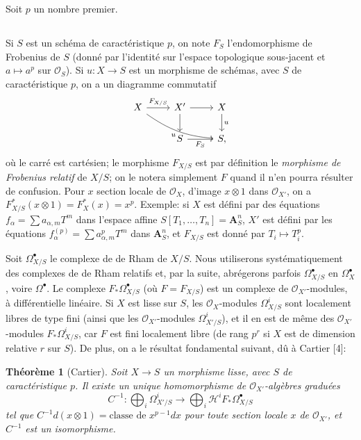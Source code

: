 \documentclass[12pt,a4paper]{article}
\theoremstyle{plain}
\newtheorem{theorem}{Th\'eor\`eme}[section]
\theoremstyle{definition}
\theoremstyle{remark}
\newcommand{\cO}{\mathcal{O}}
\begin{document}
Soit $p$ un nombre premier.

\subsection{}

Si $S$ est un sch\'ema de caract\'eristique $p$, on note $F_S$ l'endomorphisme de
Frobenius de $S$ (donn\'e par l'identit\'e sur l'espace topologique sous-jacent et $a \mapsto a^p$
sur $\cO_S$). Si $u: X \to S$ est un morphisme de sch\'emas, avec $S$ de caract\'eristique $p$, on a
un diagramme commutatif
\[
\begin{tikzcd}
X \arrow[r, "F_{X/S}"] \arrow[rrd, "u"', bend right=15] & X' \arrow[r] \arrow[d] & X \arrow[d, "u"] \\
& S \arrow[r, "F_S"'] & S,
\end{tikzcd}
\]
o\`u le carr\'e est cart\'esien; le morphisme $F_{X/S}$ est par d\'efinition le \emph{morphisme de
Frobenius relatif} de $X/S$; on le notera simplement $F$ quand il n'en pourra r\'esulter
de confusion. Pour $x$ section locale de $\cO_X$, d'image $x \otimes 1$ dans $\cO_{X'}$, on a $F_{X/S}^*(x \otimes 1)
= F_X^*(x) = x^p$. Exemple: si $X$ est d\'efini par des \'equations $f_{\alpha} = \sum a_{\alpha,m} T^m$ dans l'espace
affine $S[T_1, \ldots, T_n] = \mathbf{A}^n_S$, $X'$ est d\'efini par les \'equations $f_{\alpha}^{(p)} = \sum a_{\alpha,m}^p T^m$ dans $\mathbf{A}^n_S$, et
$F_{X/S}$ est donn\'e par $T_i \mapsto T_i^p$.

Soit $\Omega^{\bullet}_{X/S}$ le complexe de de Rham de $X/S$. Nous utiliserons syst\'ematiquement
des complexes de de Rham relatifs et, par la suite, abr\'egerons parfois $\Omega^{\bullet}_{X/S}$ en $\Omega^{\bullet}_X$,
voire $\Omega^{\bullet}$. Le complexe $F_* \Omega^{\bullet}_{X/S}$ (o\`u $F = F_{X/S}$) est un complexe de $\cO_{X'}$-modules, \`a
diff\'erentielle lin\'eaire. Si $X$ est lisse sur $S$, les $\cO_X$-modules $\Omega^i_{X/S}$ sont localement libres
de type fini (ainsi que les $\cO_{X'}$-modules $\Omega^i_{X'/S}$), et il en est de m\^eme des $\cO_{X'}$-modules
$F_* \Omega^i_{X/S}$, car $F$ est fini localement libre (de rang $p^r$ si $X$ est de dimension relative $r$ sur
$S$). De plus, on a le r\'esultat fondamental suivant, d\^u \`a Cartier [4]:

\begin{theorem}[Cartier]\label{thm:cartier}
Soit $X \to S$ un morphisme lisse, avec $S$ de caract\'eristique $p$. Il
existe un unique homomorphisme de $\cO_{X'}$-alg\`ebres gradu\'ees
\[
C^{-1}: \bigoplus_i \Omega^i_{X'/S} \to \bigoplus_i \mathscr{H}^i F_* \Omega^{\bullet}_{X/S}
\]
tel que $C^{-1} d(x \otimes 1) = \text{classe de } x^{p-1} dx$ pour toute section locale $x$ de $\cO_{X'}$, et $C^{-1}$ est
un isomorphisme.
\end{theorem}
\end{document}

